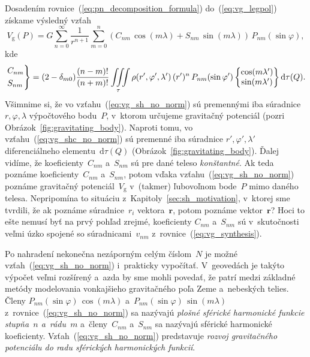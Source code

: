 \documentclass[a4paper, 12pt]{book}
\newcommand{\diff}{\mathrm d}
\newcommand{\gidx}{\mathrm g}
\let\vec\mathbf
\begin{document}
Dosadením rovnice~(\ref{eq:pn_decomposition_formula}) do~(\ref{eq:vg_legpol})
získame výsledný vzťah
%
\begin{equation}
\label{eq:vg_sh_no_norm}
V_\gidx(P) = G \sum_{n = 0}^\infty \frac{1}{r^{n + 1}} \sum_{m = 0}^{n} \left(
C_{nm} \, \cos(m\lambda) + S_{nm} \, \sin(m\lambda)\right) \,
P_{nm}(\sin\varphi){,}
\end{equation}
%
kde
%
\begin{equation}
\label{eq:vg_shc_no_norm}
\begin{rcases}
C_{nm}\\
S_{nm}
\end{rcases}
= (2 - \delta_{m0}) \frac{(n - m)!}{(n + m)!} \iiint\limits_{\tau} \rho(r',
\varphi', \lambda') \, (r')^n \, P_{nm}(\sin\varphi')
%
\begin{Bmatrix}
\cos(m\lambda')\\
\sin(m\lambda')
\end{Bmatrix}
%
\diff\tau(Q){.}
\end{equation}
%
Všimnime si, že vo vzťahu~(\ref{eq:vg_sh_no_norm}) sú premennými iba súradnice 
$r, \varphi, \lambda$ výpočtového bodu~$P$, v~ktorom určujeme gravitačný 
potenciál (pozri Obrázok~\ref{fig:gravitating_body}).  Naproti tomu, vo 
vzťahu~(\ref{eq:vg_shc_no_norm}) sú premenné iba súradnice $r',\varphi', 
\lambda'$ diferenciálneho elementu~$\diff\tau(Q)$ 
(Obrázok~\ref{fig:gravitating_body}).  Ďalej vidíme, že koeficienty~$C_{nm}$ 
a~$S_{nm}$ sú pre dané teleso \emph{konštantné}.  Ak teda poznáme 
koeficienty~$C_{nm}$ a~$S_{nm}$, potom vďaka vzťahu~(\ref{eq:vg_sh_no_norm}) 
poznáme gravitačný potenciál~$V_\gidx$ v~(takmer) ľubovoľnom bode~$P$ mimo 
daného telesa.  Nepripomína to situáciu z~Kapitoly~\ref{sec:sh_motivation}, 
v~ktorej sme tvrdili, že ak poznáme súradnice~$r_i$ vektora~$\vec r$, potom 
poznáme vektor~$\vec r$?  Hoci to ešte nemusí byť na prvý pohľad zrejmé, 
koeficienty $C_{nm}$ a~$S_{nm}$ sú v~skutočnosti veľmi úzko spojené so 
súradnicami~$v_{nm}$ z~rovnice~(\ref{eq:vg_synthesis}).

Po nahradení nekonečna nezáporným celým číslom~$N$ je možné 
vzťah~(\ref{eq:vg_sh_no_norm}) i~prakticky vypočítať.  V~geovedách je takýto
výpočet veľmi rozšírený a~azda by sme mohli povedať, že patrí medzi základné  
metódy modelovania vonkajšieho
gravitačného poľa Zeme a~nebeských telies.  Členy $P_{nm}(\sin\varphi) \,
\cos(m\lambda)$ a~$ P_{nm}(\sin\varphi) \, \sin(m\lambda)$
z~rovnice~(\ref{eq:vg_sh_no_norm}) sa nazývajú \emph{plošné sférické harmonické
funkcie stupňa~$n$ a~rádu~$m$} a~členy~$C_{nm}$ a~$S_{nm}$ sa nazývajú sférické
harmonické koeficienty.  Vzťah~(\ref{eq:vg_sh_no_norm}) predstavuje
\emph{rozvoj gravitačného potenciálu do radu sférických harmonických funkcií}.
\end{document}
